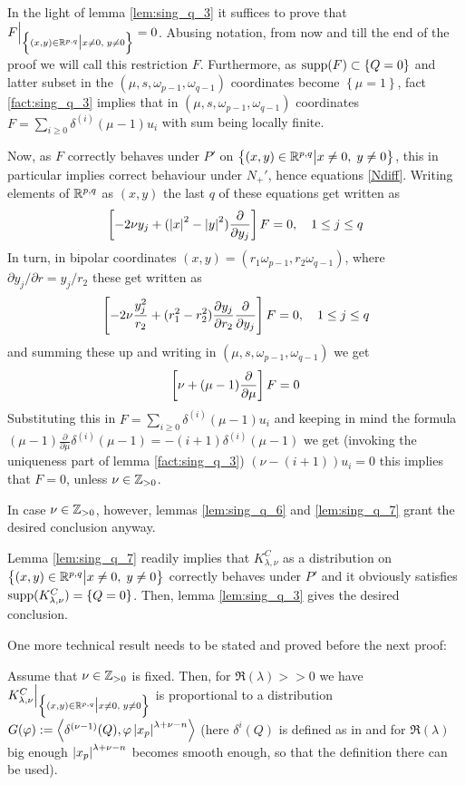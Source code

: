 \documentclass[10pt]{article} %
\theoremstyle{definition}
\theoremstyle{remark}
\begin{document}
\begin{myproof}
	In the light of lemma \ref{lem:sing_q_3} it suffices to prove that $F\Big|_{\left\{(x,y)\in\mathbb{R}^{p,q}\big| x\neq0,\;y\neq0\right\}}=0$.
	Abusing notation, from now and till the end of the proof we will call this restriction $F$.
	Furthermore, as $\operatorname{supp}(F)\subset\left\{ Q=0 \right\}$ and latter subset in the $(\mu,s,\omega_{p-1},\omega_{q-1})$ coordinates
	become $\left\{ \mu=1 \right\}$, fact \ref{fact:sing_q_3}
	implies that in $(\mu,s,\omega_{p-1},\omega_{q-1})$ coordinates 
	$F=\sum_{i\geq0}\delta^{(i)}(\mu-1)u_i$ with sum being locally finite.

	Now, as $F$ correctly behaves under $P'$ on $\left\{(x,y)\in\mathbb{R}^{p,q}\big| x\neq0,\;y\neq0\right\}$, this in particular
	implies correct behaviour under $N_+'$, hence equations \eqref{Ndiff}. Writing elements of $\mathbb{R}^{p,q}$
	as $(x,y)$ the last $q$ of these equations get written as \[\left[ -2\nu y_j+(\left|x\right|^2-\left|y\right|^2)\frac{\partial}{
	\partial y_j} \right]F=0,\quad1\leq j\leq q\]
	In turn, in bipolar coordinates $(x,y)=(r_1\omega_{p-1},r_2\omega_{q-1})$, where $\partial y_j/\partial r=
	y_j/r_2$ these get written as
	\[\left[-2\nu \frac{y_j^2}{r_2}+(r_1^2-r_2^2)\frac{\partial y_j}{\partial r_2}\frac{\partial}{\partial y_j}\right]F=0,\quad
	1\leq j\leq q\]
	and summing these up and writing in $(\mu,s,\omega_{p-1},\omega_{q-1})$ we get
	\[\left[\nu+(\mu-1)\frac{\partial}{\partial\mu}\right]F=0\]
	Substituting this in 
	$F=\sum_{i\geq0}\delta^{(i)}(\mu-1)u_i$ and keeping in mind the formula $(\mu-1)\frac{\partial}{\partial\mu}\delta^{(i)}
	(\mu-1)=-(i+1)\delta^{(i)}(\mu-1)$ we get (invoking the uniqueness part of lemma \ref{fact:sing_q_3})
	$(\nu-(i+1))u_i=0$ this implies that $F=0$, unless $\nu\in\mathbb{Z}_{>0}$.

	In case $\nu\in\mathbb{Z}_{>0}$, however, lemmas \ref{lem:sing_q_6} and \ref{lem:sing_q_7} grant the desired conclusion anyway.
\end{myproof}
\begin{myproof}
	Lemma \ref{lem:sing_q_7} readily implies that $K^C_{\lambda,\nu}$ as a distribution on $\left\{(x,y)\in\mathbb{R}^{p,q}\big| x\neq0,\;y\neq0\right\}$ correctly
	behaves under $P'$ and it obviously satisfies $\operatorname{supp}(K^C_{\lambda,\nu})=\left\{ Q=0 \right\}$.
	Then, lemma \ref{lem:sing_q_3} gives the desired conclusion.
\end{myproof}
One more technical result needs to be stated and proved before the next proof:
\begin{mylem}
	\label{lem:sing_q_8}
	Assume that $\nu\in\mathbb{Z}_{>0}$ is fixed. Then, for $\Re(\lambda)>>0$ we have
	$K_{\lambda,\nu}^C\Big|_{\left\{(x,y)\in\mathbb{R}^{p,q}\big| x\neq0,\;y\neq0\right\}}$ is proportional to a distribution
	$G(\varphi):=\left<\delta^{(\nu-1)}(Q),\varphi\left|x_p\right|^{\lambda+\nu-n}\right>$
	(here $\delta^{i}(Q)$ is defined as in
	\cite[ch. III, sec. 2.1]{gelfand1980distribution} and for $\Re(\lambda)$ big enough $\left|x_p\right|^{\lambda+\nu-n}$ becomes
	smooth enough, so that the definition there can be used).
\end{mylem}
\end{document}
